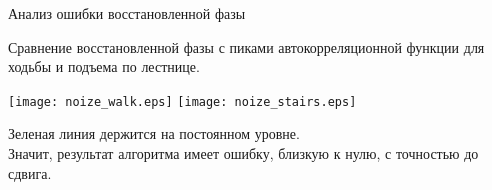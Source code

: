 \documentclass{beamer}
\begin{document}
\begin{frame}{Анализ ошибки восстановленной фазы}

Сравнение восстановленной фазы с пиками автокорреляционной функции для ходьбы и подъема по лестнице.
\bigskip

\hfil\hfil\texttt{[image: noize\_walk.eps]}
\hfil\hfil\texttt{[image: noize\_stairs.eps]}

Зеленая линия держится на постоянном уровне.\\Значит, результат алгоритма имеет ошибку, близкую к нулю, с точностью до сдвига.



    





\end{frame}
\end{document}
